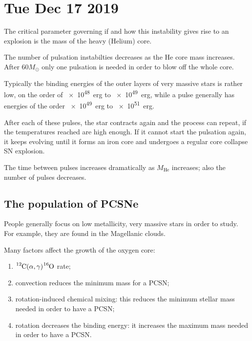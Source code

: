 \documentclass[main.tex]{subfiles}
\begin{document}
\section*{Tue Dec 17 2019}


The critical parameter governing if and how this instability gives rise to an explosion is the mass of the heavy (Helium) core.

The number of pulsation instabilties decreases as the He core mass increases.
After \(60 M_{\odot}\) only one pulsation is needed in order to blow off the whole core.

Typically the binding energies of the outer layers of very massive stars is rather low, on the order of \SI{e48}{erg} to \SI{e49}{erg}, while a pulse generally has energies of the order \SI{e49}{erg} to \SI{e51}{erg}. 

After each of these pulses, the star contracts again and the process can repeat, if the temperatures reached are high enough.
If it cannot start the pulsation again, it keeps evolving until it forms an iron core and undergoes a regular core collapse SN explosion.

The time between pulses increases dramatically as \(M _{\text{He}}\) increases; also the number of pulses decreases.

\subsection{The population of PCSNe}

People generally focus on low metallicity, very massive stars in order to study.
For example, they are found in the Magellanic clouds. 

Many factors affect the growth of the oxygen core: 
\begin{enumerate}
    \item \(\ce{^{12}C}(\alpha , \gamma ) \ce{^{16}O}\) rate;
    \item convection reduces the minimum mass for a PCSN;
    \item rotation-induced chemical mixing: this reduces the minimum stellar mass needed in order to have a PCSN;
    \item rotation decreases the binding energy: it increases the maximum mass needed in order to have a PCSN.
\end{enumerate}
\end{document}
